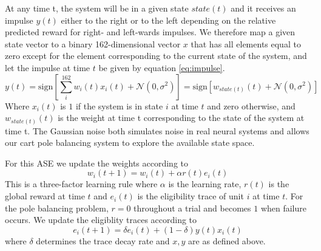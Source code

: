 \documentclass{article}
\begin{document}
At any time t, the system will be in a given state $state(t)$ and it receives an impulse $y(t)$ either to the right or to the left depending on the relative predicted reward for right- and left-wards impulses. We therefore map a given state vector to a binary 162-dimensional vector $x$ that has all elements equal to zero except for the element corresponding to the current state of the system, and let the impulse at time $t$ be given by equation \ref{eq:impulse}.
\begin{equation}\label{eq:impulse}
y(t) = \text{sign}[\sum_i^{162}{w_i(t)x_i(t)} + \mathcal{N}(0, \sigma^2)] = \text{sign}[w_{state(t)}(t) + \mathcal{N}(0, \sigma^2)] 
\end{equation}
Where $x_i(t)$ is $1$ if the system is in state $i$ at time $t$ and zero otherwise, and $w_{state(t)}(t)$ is the weight at time t corresponding to the state of the system at time t. The Gaussian noise both simulates noise in real neural systems and allows our cart pole balancing system to explore the available state space.

For this ASE we update the weights according to
\begin{equation}
w_i(t+1) = w_i(t) + \alpha r(t) e_i(t)
\end{equation}
This is a three-factor learning rule where $\alpha$ is the learning rate, $r(t)$ is the global reward at time $t$ and $e_i(t)$ is the eligibility trace of unit $i$ at time $t$. For the pole balancing problem, $r=0$ throughout a trial and becomes $1$ when failure occurs. We update the eligiblity traces according to
\begin{equation}
e_i(t+1) = \delta e_i(t) + (1-\delta) y(t) x_i(t)
\end{equation}
where $\delta$ determines the trace decay rate and $x, y$ are as defined above.
\end{document}
